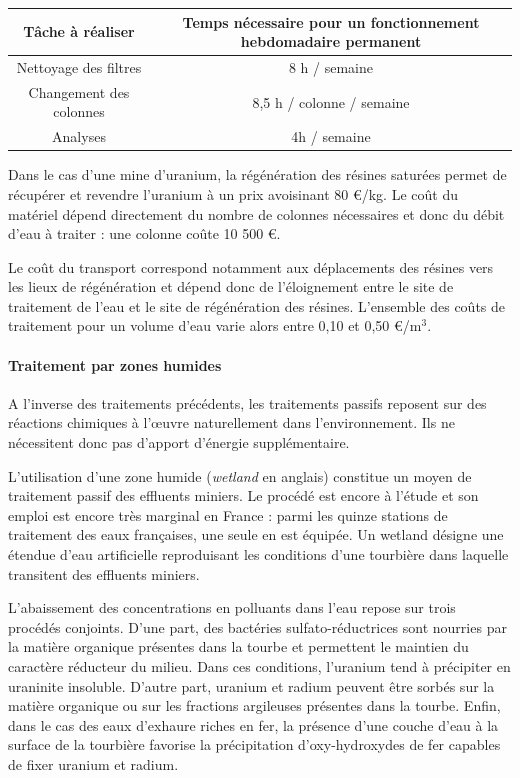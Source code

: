 \documentclass{article}
\begin{document}
\begin{center}
\begin{tabular}{ |c |c |}
\hline
 Tâche à réaliser & Temps nécessaire pour un fonctionnement hebdomadaire permanent \\ 
 \hline
 Nettoyage des filtres & 8 h / semaine \\ 
 \hline
 Changement des colonnes & 8,5 h / colonne / semaine  \\
 \hline
Analyses & 4h / semaine  \\
 \hline
\end{tabular}
\end{center}

Dans le cas d’une mine d’uranium, la régénération des résines saturées permet de récupérer et revendre l’uranium à un prix avoisinant 80 €/kg.
Le coût du matériel dépend directement du nombre de colonnes nécessaires et donc du débit d’eau à traiter : une colonne coûte 10 500 €.

Le coût du transport correspond notamment aux déplacements des résines vers les lieux de régénération et dépend donc de l’éloignement entre le site de traitement de l’eau et le site de régénération des résines.
L’ensemble des coûts de traitement pour un volume d’eau varie alors entre 0,10 et 0,50 €/$\text{m}^3$.

\paragraph{Traitement par zones humides}

A l’inverse des traitements précédents, les traitements passifs reposent sur des réactions chimiques à l’œuvre naturellement dans l’environnement. Ils ne nécessitent donc pas d’apport d’énergie supplémentaire. 

L’utilisation d’une zone humide (\textit{wetland} en anglais) constitue un moyen de traitement passif des effluents miniers. Le procédé est encore à l’étude et son emploi est encore très marginal en France : parmi les quinze stations de traitement des eaux françaises, une seule en est équipée. Un wetland désigne une étendue d’eau artificielle reproduisant les conditions d’une tourbière dans laquelle transitent des effluents miniers. 

L’abaissement des concentrations en polluants dans l’eau repose sur trois procédés conjoints. D’une part, des bactéries sulfato-réductrices sont nourries par la matière organique présentes dans la tourbe et permettent le maintien du caractère réducteur du milieu. Dans ces conditions, l’uranium tend à précipiter en uraninite insoluble. D’autre part, uranium et radium peuvent être sorbés sur la matière organique ou sur les fractions argileuses présentes dans la tourbe. Enfin, dans le cas des eaux d’exhaure riches en fer, la présence d’une couche d’eau à la surface de la tourbière favorise la précipitation d’oxy-hydroxydes de fer capables de fixer uranium et radium. 
\end{document}
